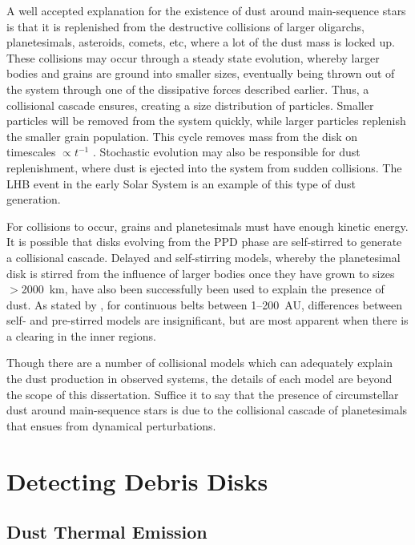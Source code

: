    
    A well accepted explanation for the existence of dust around main-sequence stars is that it is replenished from the destructive collisions of larger oligarchs, planetesimals, asteroids, comets, etc, where a lot of the dust mass is locked up. These collisions may occur through a steady state evolution, whereby larger bodies and grains are ground into smaller sizes, eventually being thrown out of the system through one of the dissipative forces described earlier. Thus, a collisional cascade ensures, creating a size distribution of particles. Smaller particles will be removed from the system quickly, while larger particles replenish the smaller grain population. This cycle removes mass from the disk on timescales $\propto t^{-1}$ \citep{Wyatt2007}. Stochastic evolution may also be responsible for dust replenishment, where dust is ejected into the system from sudden collisions. The LHB event in the early Solar System is an example of this type of dust generation. 
    
    For collisions to occur, grains and planetesimals must have enough kinetic energy. It is possible that disks evolving from the PPD phase are self-stirred to generate a collisional cascade. Delayed and self-stirring models, whereby the planetesimal disk is stirred from the influence of larger bodies once they have grown to sizes $>$2000~km, have also been successfully been used to explain the presence of dust. As stated by \citet{Wyatt2008}, for continuous belts between 1--200~AU, differences between self- and pre-stirred models are insignificant, but are most apparent when there is a clearing in the inner regions.
    
    Though there are a number of collisional models which can adequately explain the dust production in observed systems, the details of each model are beyond the scope of this dissertation. Suffice it to say that the presence of circumstellar dust around main-sequence stars is due to the collisional cascade of planetesimals that ensues from dynamical perturbations.
    
\section{Detecting Debris Disks}\label{sec:detect_dd}

    \subsection{Dust Thermal Emission}

